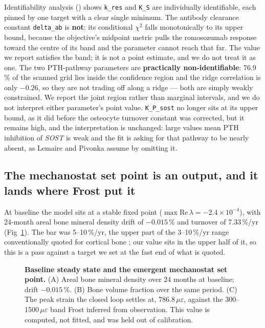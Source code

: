 \documentclass[10pt,letterpaper]{article}
\newcommand{\ue}{\ensuremath{\mu\varepsilon}}
\begin{document}
Identifiability analysis () shows \texttt{k\_res} and
\texttt{K\_S} are individually identifiable, each pinned by one target with a
clear single minimum. The antibody clearance constant \texttt{delta\_ab} is
\textbf{not}: its conditional $\chi^2$ falls monotonically to its upper bound,
because the objective's midpoint metric pulls the romosozumab response toward the
centre of its band and the parameter cannot reach that far. The value we report
satisfies the band; it is not a point estimate, and we do not treat it as one.
The two PTH-pathway parameters are \textbf{practically non-identifiable}:
76.9\,\% of the scanned grid lies inside the confidence region and the ridge
correlation is only $-0.26$, so they are not trading off along a ridge --- both
are simply weakly constrained. We report the joint region rather than marginal
intervals, and we do not interpret either parameter's point value.
\texttt{K\_P\_sost} no longer sits at its upper bound, as it did before the
osteocyte turnover constant was corrected, but it remains high, and the
interpretation is unchanged: large values mean PTH inhibition of \emph{SOST} is
weak and the fit is asking for that pathway to be nearly absent, as Lemaire and
Pivonka assume by omitting it.

\subsection*{The mechanostat set point is an output, and it lands where Frost put it}

At baseline the model sits at a stable fixed point
($\max\mathrm{Re}\,\lambda = -2.4\times10^{-4}$), with 24-month areal bone
mineral density drift of $-0.015\,\%$ and turnover of 7.33\,\%/yr
(Fig~\ref{fig1}). The bar was 5--10\,\%/yr, the upper part of the
3--10\,\%/yr range conventionally quoted for cortical bone
\cite{parfitt2002}; our value sits in the upper half of it, so this is a pass
against a target we set at the fast end of what is quoted.

\begin{figure}[!h]
\caption{{\bf Baseline steady state and the emergent mechanostat set point.}
(A) Areal bone mineral density over 24 months at baseline; drift
$-0.015\,\%$. (B) Bone volume fraction over the same period. (C) The peak
strain the closed loop settles at, 786.8\,\ue, against the 300--1500\,\ue
band Frost inferred from observation. This value is computed, not fitted, and was held
out of calibration.}
\label{fig1}
\end{figure}
\end{document}
